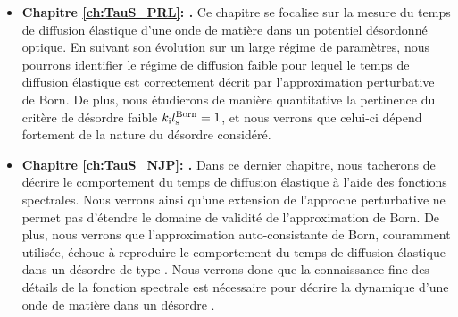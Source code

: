 \begin{itemize}
\item[\textendash] \textbf{Chapitre \ref{ch:TauS_PRL}: {\hypersetup{linkcolor=black}}.} Ce chapitre se focalise sur la mesure du temps de diffusion élastique d'une onde de matière dans un potentiel désordonné optique. En suivant son évolution sur un large régime de paramètres, nous pourrons identifier le régime de diffusion faible pour lequel le temps de diffusion élastique est correctement décrit par l'approximation perturbative de Born. De plus, nous étudierons de manière quantitative la pertinence du critère de désordre faible $k_{\mathrm{i}}l_{\mathrm{s}}^{\mathrm{Born}}=1$, et nous verrons que celui-ci dépend fortement de la nature du désordre considéré. \\

\item[\textendash] \textbf{Chapitre \ref{ch:TauS_NJP}: {\hypersetup{linkcolor=black}}.} Dans ce dernier chapitre, nous tacherons de décrire le comportement du temps de diffusion élastique à l'aide des fonctions spectrales. Nous verrons ainsi qu'une extension de l'approche perturbative ne permet pas d'étendre le domaine de validité de l'approximation de Born. De plus, nous verrons que l'approximation auto-consistante de Born, couramment utilisée, échoue à reproduire le comportement du temps de diffusion élastique dans un désordre de type \speckle . Nous verrons donc que la connaissance fine des détails de la fonction spectrale est nécessaire pour décrire la dynamique d'une onde de matière dans un désordre \speckle .
\end{itemize}


